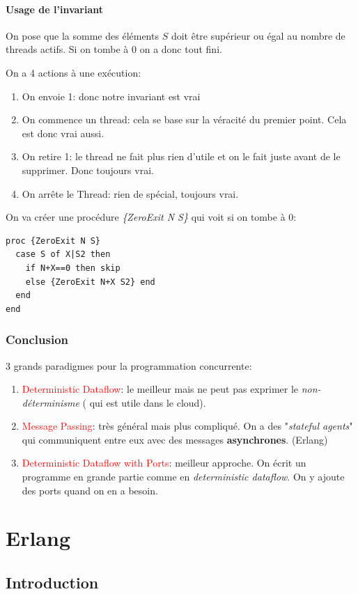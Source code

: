 \documentclass{report}
\begin{document}
\subsubsection{Usage de l'invariant}
On pose que la somme des éléments $S$ doit être supérieur ou égal au nombre de threads actifs. Si on tombe à $0$ on a donc tout fini.\par 
On a 4 actions à une exécution:
\begin{enumerate}
\item On envoie 1: donc notre invariant est vrai
\item On commence un thread: cela se base sur la véracité du premier point. Cela est donc vrai aussi.
\item On retire 1: le thread ne fait plus rien d'utile et on le fait juste avant de le supprimer. Donc toujours vrai.
\item On arrête le Thread: rien de spécial, toujours vrai.
\end{enumerate}
On va créer une procédure \textit{\{ZeroExit N S\}} qui voit si on tombe à 0:
\begin{lstlisting}[escapechar=\%]
proc {ZeroExit N S}
  case S of X|S2 then
    if N+X==0 then skip 
    else {ZeroExit N+X S2} end
  end
end
\end{lstlisting}

\subsection{Conclusion}
3 grands paradigmes pour la programmation concurrente:
\begin{enumerate}
\item \textcolor{red}{Deterministic Dataflow}: le meilleur mais ne peut pas exprimer le \textit{non-déterminisme} ( qui est utile dans le cloud).
\item \textcolor{red}{Message Passing}: très général mais plus compliqué. On a des "\textit{stateful agents}" qui communiquent entre eux avec des messages \textbf{asynchrones}. (Erlang)
\item \textcolor{red}{Deterministic Dataflow with Ports}: meilleur approche. On écrit un programme en grande partie comme en \textit{deterministic dataflow}. On y ajoute des ports quand on en a besoin.
\end{enumerate}

\chapter{Erlang}
\section{Introduction}
\end{document}
